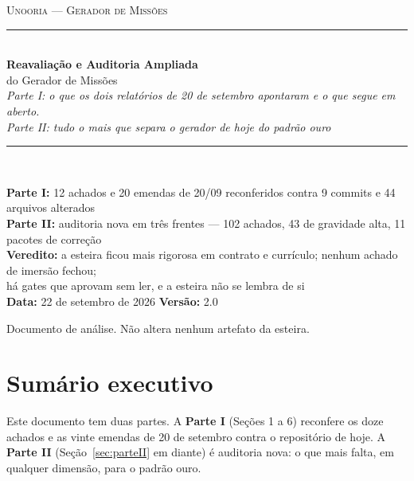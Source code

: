 \documentclass[11pt,a4paper]{article}
\begin{document}
\begin{titlepage}
\centering
\vspace*{2.5cm}

{\color{SteelBlue}\large\scshape Unooria --- Gerador de Missões}\\[0.4cm]
{\color{BorderGray}\rule{0.8\textwidth}{1.2pt}}\\[1.0cm]

{\Huge\bfseries\color{NavyBlue} Reavaliação e Auditoria Ampliada}\\[0.5cm]
{\LARGE\color{NavyBlue} do Gerador de Missões}\\[1.2cm]

{\large\itshape Parte I: o que os dois relatórios de 20 de setembro apontaram e o que segue em aberto.}\\[0.2cm]
{\large\itshape Parte II: tudo o mais que separa o gerador de hoje do padrão ouro}\\[1.5cm]

{\color{BorderGray}\rule{0.8\textwidth}{0.6pt}}\\[1.0cm]

\begin{minipage}{0.8\textwidth}
\centering
\small
\textbf{Parte I:} 12 achados e 20 emendas de 20/09 reconferidos contra 9 commits e 44 arquivos alterados\\
\textbf{Parte II:} auditoria nova em três frentes --- 102 achados, 43 de gravidade alta, 11 pacotes de correção\\
\textbf{Veredito:} a esteira ficou mais rigorosa em contrato e currículo; nenhum achado de imersão fechou;\\ há gates que aprovam sem ler, e a esteira não se lembra de si\\[0.6cm]
\textbf{Data:} 22 de setembro de 2026 \quad\textbullet\quad \textbf{Versão:} 2.0
\end{minipage}

\vfill
{\small\color{Charcoal} Documento de análise. Não altera nenhum artefato da esteira.}
\end{titlepage}

\tableofcontents
\newpage

\section{Sumário executivo}

Este documento tem duas partes. A \textbf{Parte I} (Seções 1 a 6) reconfere os doze achados e as
vinte emendas de 20 de setembro contra o repositório de hoje. A \textbf{Parte II}
(Seção~\ref{sec:parteII} em diante) é auditoria nova: o que mais falta, em qualquer dimensão, para o
padrão ouro.
\end{document}
